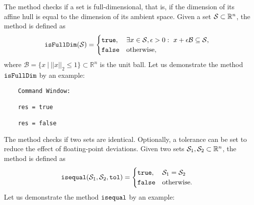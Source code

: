 The method  checks if a set is full-dimensional, that is, if the dimension of its affine hull is equal to the dimension of its ambient space. Given a set $\mathcal{S} \subset \mathbb{R}^n$, the method  is defined as
	\begin{equation*}
		{\normalfont \texttt{isFullDim}}(\mathcal{S}) =
		\begin{cases}
			{\normalfont \texttt{true}}, & \exists x \in \mathcal{S}, \epsilon > 0: ~ x + \epsilon \mathcal{B} \subseteq \mathcal{S}, \\
			{\normalfont \texttt{false}} & \mathrm{otherwise,}
		\end{cases}
	\end{equation*}	
where $\mathcal{B} = \{x ~|~ ||x||_2 \leq 1 \} \subset \mathbb{R}^n$ is the unit ball. Let us demonstrate the method ${\normalfont \texttt{isFullDim}}$ by an example:

\begin{center}
\begin{minipage}[t]{0.40\textwidth}
	\vspace{10pt}
	\footnotesize
	
\end{minipage}
\begin{minipage}[t]{0.25\textwidth}
	\vspace{10pt}

	\begin{verbatim}	
	Command Window:
	
	res = true
	
	res = false
	\end{verbatim}
\end{minipage}
\end{center}





The method  checks if two sets are identical. Optionally, a tolerance can be set to reduce the effect of floating-point deviations. Given two sets $\mathcal{S}_1,\mathcal{S}_2 \subset \mathbb{R}^n$, the method  is defined as
	\begin{equation*}
		{\normalfont \texttt{isequal}}(\mathcal{S}_1,\mathcal{S}_2,{\normalfont \texttt{tol}}) =
		\begin{cases}
			{\normalfont \texttt{true}}, & \mathcal{S}_1 = \mathcal{S}_2 \\
			{\normalfont \texttt{false}} & \mathrm{otherwise}.
		\end{cases}
	\end{equation*}	
Let us demonstrate the method ${\normalfont \texttt{isequal}}$ by an example:

